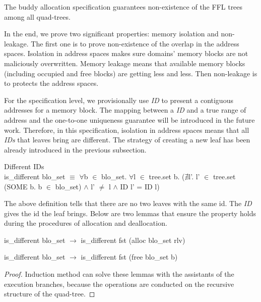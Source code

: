 \documentclass[runningheads]{llncs}
\begin{document}
\begin{theorem}
The buddy allocation specification guarantees non-existence of the FFL trees among all quad-trees.
\end{theorem}

In the end, we prove two significant properties: memory isolation and non-leakage. The first one is to prove non-existence of the overlap in the address spaces. Isolation in address spaces makes sure domains' memory blocks are not maliciously overwritten. Memory leakage means that available memory blocks (including occupied and free blocks) are getting less and less. Then non-leakage is to protects the address spaces.

For the specification level, we provisionally use \emph{ID} to present a contiguous addresses for a memory block. The mapping between a \emph{ID} and a true range of address and the one-to-one uniqueness guarantee will be introduced in the future work. Therefore, in this specification, isolation in address spaces means that all \emph{IDs} that leaves bring are different. The strategy of creating a new leaf has been already introduced in the previous subsection.

\begin{definition} {Different IDs} \\
is\_different blo\_set $\equiv$ $\forall$b $\in$ blo\_set. $\forall$l $\in$ tree.set b. ($\nexists$l'. l' $\in$ tree.set (SOME b. b $\in$ blo\_set) $\wedge$ l' $\ne$ l $\wedge$ ID l' = ID l)
\end{definition}

The above definition tells that there are no two leaves with the same id. The \emph{ID} gives the id the leaf brings. Below are two lemmas that ensure the property holds during the procedures of allocation and deallocation.

\begin{lemma}
is\_different blo\_set $\longrightarrow$ is\_different fst (alloc blo\_set rlv)
\end{lemma}

\begin{lemma}
is\_different blo\_set $\longrightarrow$ is\_different fst (free blo\_set b)
\end{lemma}

\begin{proof}
Induction method can solve these lemmas with the assistants of the execution branches, because the operations are conducted on the recursive structure of the quad-tree.
\end{proof}
\end{document}
